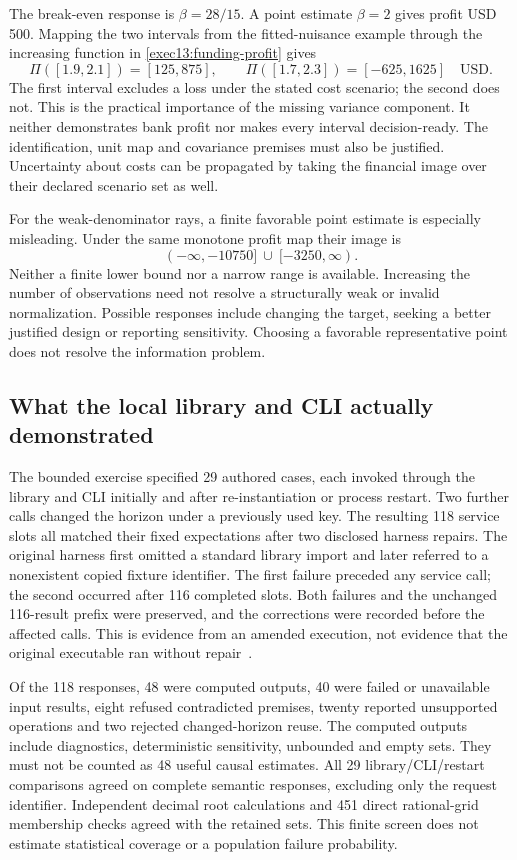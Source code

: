 The break-even response is $\beta=28/15$. A point estimate $\beta=2$
gives profit USD 500. Mapping the two intervals from the fitted-nuisance
example through the increasing function in
\eqref{exec13:funding-profit} gives
\[
 \Pi([1.9,2.1])=[125,875],\qquad
 \Pi([1.7,2.3])=[-625,1625]\quad\text{USD}.
\]
The first interval excludes a loss under the stated cost scenario; the
second does not. This is the practical importance of the missing variance
component. It neither demonstrates bank profit nor makes every interval
decision-ready. The identification, unit map and covariance premises must
also be justified. Uncertainty about costs can be propagated by taking the
financial image over their declared scenario set as well.

For the weak-denominator rays, a finite favorable point estimate is especially
misleading. Under the same monotone profit map their image is
\[
 (-\infty,-10750]\ \cup\ [-3250,\infty).
\]
Neither a finite lower bound nor a narrow range is available. Increasing the
number of observations need not resolve a structurally weak or invalid
normalization. Possible responses include changing the target, seeking a
better justified design or reporting sensitivity. Choosing a favorable
representative point does not resolve the information problem.

\subsection{What the local library and CLI actually demonstrated}

The bounded exercise specified 29 authored cases, each invoked through the
library and CLI initially and after re-instantiation or process restart.
Two further calls changed the horizon under a previously used key. The
resulting 118 service slots all matched their fixed expectations after two
disclosed harness repairs. The original harness first omitted a standard
library import and later referred to a nonexistent copied fixture identifier.
The first failure preceded any service call; the second occurred after 116
completed slots. Both failures and the unchanged 116-result prefix were
preserved, and the corrections were recorded before the affected calls.
This is evidence from an amended execution, not evidence that the original
executable ran without repair~\citep{exec13_funding_runtime}.

Of the 118 responses, 48 were computed outputs, 40 were failed or unavailable
input results, eight refused contradicted premises, twenty reported
unsupported operations and two rejected changed-horizon reuse. The computed
outputs include diagnostics, deterministic sensitivity, unbounded and empty
sets. They must not be counted as 48 useful causal estimates. All 29
library/CLI/restart comparisons agreed on complete semantic responses,
excluding only the request identifier. Independent decimal root calculations
and 451 direct rational-grid membership checks agreed with the retained
sets. This finite screen does not estimate statistical coverage or a
population failure probability.

